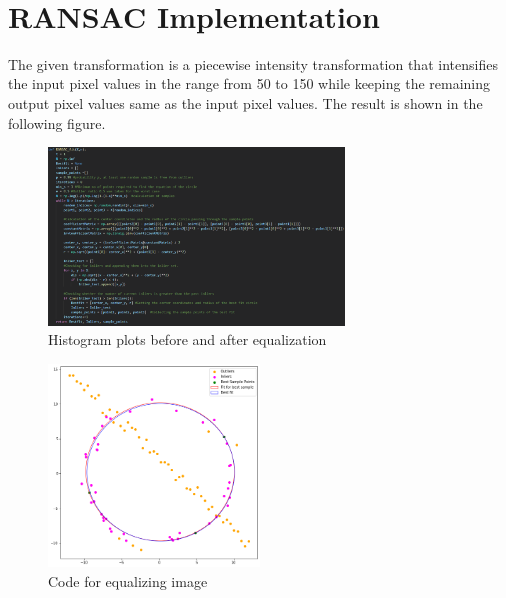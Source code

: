 \documentclass[11pt]{article}
\begin{document}
\newpage
{}
\begin{flushleft}
\vspace*{-1cm}
\hspace*{-3.6cm}
\\
[0.4cm]
\hspace*{-3cm}
\section{RANSAC Implementation}
The given transformation is a piecewise intensity transformation that intensifies the input pixel values in the range from 50 to 150 while keeping the remaining output pixel values same as the input pixel values. The result is shown in the following figure.
\begin{figure}[htp]
    \centering
    \includegraphics[width=0.7\textwidth]{Question1code.png}
    \caption{Histogram plots before and after equalization}
\end{figure}
\vspace{-0.5cm}
\begin{figure}[htp]
    \centering
    \includegraphics[width=0.5\textwidth]{Question1output.png}
    \caption{Code for equalizing image}
\end{figure}








\end{flushleft}
\end{document}
